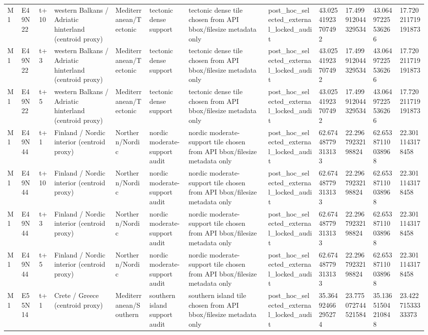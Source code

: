 \begin{landscape}
\begin{longtable}{llllllllllll}
M1 & E49N22 & t+10 & western Balkans / Adriatic hinterland (centroid proxy) & Mediterranean/Tectonic & tectonic dense support & tectonic dense tile chosen from API bbox/filesize metadata only & post\_hoc\_selected\_external\_locked\_audit & 43.02541923707492 & 17.499912044329534 & 43.06497225536266 & 17.720211719191873 \\
M1 & E49N22 & t+3 & western Balkans / Adriatic hinterland (centroid proxy) & Mediterranean/Tectonic & tectonic dense support & tectonic dense tile chosen from API bbox/filesize metadata only & post\_hoc\_selected\_external\_locked\_audit & 43.02541923707492 & 17.499912044329534 & 43.06497225536266 & 17.720211719191873 \\
M1 & E49N22 & t+5 & western Balkans / Adriatic hinterland (centroid proxy) & Mediterranean/Tectonic & tectonic dense support & tectonic dense tile chosen from API bbox/filesize metadata only & post\_hoc\_selected\_external\_locked\_audit & 43.02541923707492 & 17.499912044329534 & 43.06497225536266 & 17.720211719191873 \\
M1 & E49N44 & t+1 & Finland / Nordic interior (centroid proxy) & Northern/Nordic & nordic moderate-support audit & nordic moderate-support tile chosen from API bbox/filesize metadata only & post\_hoc\_selected\_external\_locked\_audit & 62.67448779313133 & 22.29679232198824 & 62.65387110038968 & 22.3011143178458 \\
M1 & E49N44 & t+10 & Finland / Nordic interior (centroid proxy) & Northern/Nordic & nordic moderate-support audit & nordic moderate-support tile chosen from API bbox/filesize metadata only & post\_hoc\_selected\_external\_locked\_audit & 62.67448779313133 & 22.29679232198824 & 62.65387110038968 & 22.3011143178458 \\
M1 & E49N44 & t+3 & Finland / Nordic interior (centroid proxy) & Northern/Nordic & nordic moderate-support audit & nordic moderate-support tile chosen from API bbox/filesize metadata only & post\_hoc\_selected\_external\_locked\_audit & 62.67448779313133 & 22.29679232198824 & 62.65387110038968 & 22.3011143178458 \\
M1 & E49N44 & t+5 & Finland / Nordic interior (centroid proxy) & Northern/Nordic & nordic moderate-support audit & nordic moderate-support tile chosen from API bbox/filesize metadata only & post\_hoc\_selected\_external\_locked\_audit & 62.67448779313133 & 22.29679232198824 & 62.65387110038968 & 22.3011143178458 \\
M1 & E55N14 & t+1 & Crete / Greece (centroid proxy) & Mediterranean/Southern & southern island support audit & southern island tile chosen from API bbox/filesize metadata only & post\_hoc\_selected\_external\_locked\_audit & 35.36492466295274 & 23.775072744521584 & 35.13651504210848 & 23.42271533333373 \\

\end{longtable}
\end{landscape}
